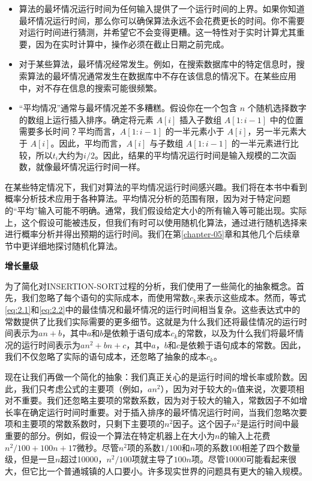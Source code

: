 \documentclass[lang=cn,newtx,10pt,scheme=chinese]{elegantbook}
\begin{document}
\begin{itemize}
    \item 算法的最坏情况运行时间为任何输入提供了一个运行时间的上界。如果你知道最坏情况运行时间，那么你可以确保算法永远不会花费更长的时间。你不需要对运行时间进行猜测，并希望它不会变得更糟。这一特性对于实时计算尤其重要，因为在实时计算中，操作必须在截止日期之前完成。
    \item 对于某些算法，最坏情况经常发生。例如，在搜索数据库中的特定信息时，搜索算法的最坏情况通常发生在数据库中不存在该信息的情况下。在某些应用中，对不存在信息的搜索可能很频繁。
    \item ``平均情况''通常与最坏情况差不多糟糕。假设你在一个包含 $n$ 个随机选择数字的数组上运行插入排序。确定将元素 $A[i]$ 插入子数组 $A[1:i-1]$ 中的位置需要多长时间？平均而言，$A[1:i-1]$ 的一半元素小于 $A[i]$，另一半元素大于 $A[i]$。因此，平均而言，$A[i]$ 与子数组 $A[1:i-1]$ 的一半元素进行比较，所以$t_i$大约为$i/2$。因此，结果的平均情况运行时间是输入规模的二次函数，就像最坏情况运行时间一样。
\end{itemize}

在某些特定情况下，我们对算法的平均情况运行时间感兴趣。我们将在本书中看到概率分析技术应用于各种算法。平均情况分析的范围有限，因为对于特定问题的``平均''输入可能不明确。通常，我们假设给定大小的所有输入等可能出现。实际上，这个假设可能被违反，但我们有时可以使用随机化算法，通过进行随机选择来进行概率分析并得出预期的运行时间。我们在第\ref{chapter-05}章和其他几个后续章节中更详细地探讨随机化算法。

\textbf{增长量级}

为了简化对INSERTION-SORT过程的分析，我们使用了一些简化的抽象概念。首先，我们忽略了每个语句的实际成本，而使用常数$c_k$来表示这些成本。然而，等式\eqref{eq:2.1}和\eqref{eq:2.2}中的最佳情况和最坏情况的运行时间相当复杂。这些表达式中的常数提供了比我们实际需要的更多细节。这就是为什么我们还将最佳情况的运行时间表示为$an+b$，其中$a$和$b$是依赖于语句成本$c_k$的常数，以及为什么我们将最坏情况的运行时间表示为$an^2+bn+c$，其中$a$，$b$和$c$是依赖于语句成本的常数。因此，我们不仅忽略了实际的语句成本，还忽略了抽象的成本$c_k$。

现在让我们再做一个简化的抽象：我们真正关心的是运行时间的增长率或阶数。因此，我们只考虑公式的主要项（例如，$an^2$），因为对于较大的$n$值来说，次要项相对不重要。我们还忽略主要项的常数系数，因为对于较大的输入，常数因子不如增长率在确定运行时间时重要。对于插入排序的最坏情况运行时间，当我们忽略次要项和主要项的常数系数时，只剩下主要项的$n^2$因子。这个因子$n^2$是运行时间中最重要的部分。例如，假设一个算法在特定机器上在大小为$n$的输入上花费$n^2/100 + 100n + 17$微秒。尽管$n^2$项的系数$1/100$和$n$项的系数100相差了四个数量级，但是一旦$n$超过10000，$n^2/100$项就主导了$100n$项。尽管10000可能看起来很大，但它比一个普通城镇的人口要小。许多现实世界的问题具有更大的输入规模。
\end{document}
